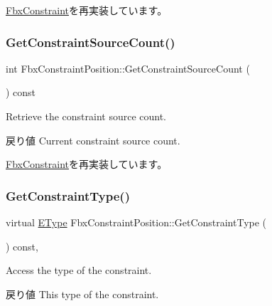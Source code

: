 \hyperlink{class_fbx_constraint_a5ff6fe6fc98af1e33e8b297bc1cea007}{Fbx\+Constraint}を再実装しています。

\mbox{\label{class_fbx_constraint_position_a5f6c49200df6a7a1fe704084c2b56e09}} 
\subsubsection{\texorpdfstring{Get\+Constraint\+Source\+Count()}{GetConstraintSourceCount()}}
{\footnotesize\ttfamily int Fbx\+Constraint\+Position\+::\+Get\+Constraint\+Source\+Count (\begin{DoxyParamCaption}{ }\end{DoxyParamCaption}) const\hspace{0.3cm}{\ttfamily [virtual]}}

Retrieve the constraint source count. \begin{DoxyReturn}{戻り値}
Current constraint source count. 
\end{DoxyReturn}


\hyperlink{class_fbx_constraint_aa702f86c6a1832ce3b4905911e66c58f}{Fbx\+Constraint}を再実装しています。

\mbox{\label{class_fbx_constraint_position_a79f710b1fec4b1285b53dec13ea68824}} 
\subsubsection{\texorpdfstring{Get\+Constraint\+Type()}{GetConstraintType()}}
{\footnotesize\ttfamily virtual \hyperlink{class_fbx_constraint_a49c1634663395eab7c28856df233ec66}{E\+Type} Fbx\+Constraint\+Position\+::\+Get\+Constraint\+Type (\begin{DoxyParamCaption}{ }\end{DoxyParamCaption}) const\hspace{0.3cm}{\ttfamily [protected]}, {\ttfamily [virtual]}}

Access the type of the constraint. \begin{DoxyReturn}{戻り値}
This type of the constraint. 
\end{DoxyReturn}


